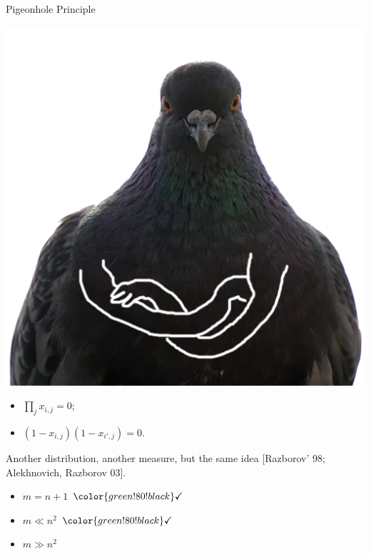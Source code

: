 \begin{frame}{Pigeonhole Principle}

    \begin{minipage}{0.4\linewidth}
        \centering
        
    \end{minipage}
    \pause
    \begin{minipage}{0.58\linewidth}
        \begin{center}
            \includegraphics[width = .3\textwidth]{pics/pigeon3.png}
        \end{center}
        \begin{itemize}
            \item $\prod\limits_{j} x_{i, j} = 0$;
            \item $(1 - x_{i, j})(1 - x_{i', j}) = 0$.
        \end{itemize}
    \end{minipage}

    \pause
    \vspace{0.5cm}

    Another distribution, another measure, but the same idea [Razborov' 98; Alekhnovich, Razborov 03].

    \vspace{0.2cm}
    \pause
    \begin{minipage}{0.3\linewidth}
        \centering
        \begin{itemize}
            \item $m = n + 1$ \pause $\color{green!80!black}\checkmark$
        \end{itemize}
    \end{minipage}
    \pause
    \begin{minipage}{0.3\linewidth}
        \centering
        \begin{itemize}
            \item $m \ll n^2$ \pause $\color{green!80!black}\checkmark$
        \end{itemize}
    \end{minipage}
    \pause
    \begin{minipage}{0.3\linewidth}
        \centering
        \begin{itemize}
            \item $m \gg n^2$ \pause 
        \end{itemize}
    \end{minipage}
\end{frame}